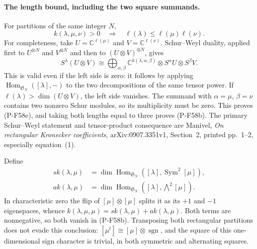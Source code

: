 \paragraph{The length bound, including the two square summands.}
For partitions of the same integer $N$,
\[
 k(\lambda,\mu,\nu)>0
          \quad\Longrightarrow\quad
 \ell(\lambda)\le\ell(\mu)\ell(\nu).                   \tag{P-F58e}
\]
For completeness, take $U=\mathbb C^{\ell(\mu)}$ and
$V=\mathbb C^{\ell(\nu)}$.  Schur--Weyl duality, applied
first to $U^{\otimes N}$ and $V^{\otimes N}$ and then to
$(U\otimes V)^{\otimes N}$, gives
\[
 S^\lambda(U\otimes V)
   \cong\bigoplus_{\alpha,\beta}
       \mathbb C^{k(\lambda,\alpha,\beta)}
                        \otimes S^\alpha U\otimes S^\beta V.
                                                        \tag{P-F58f}
\]
This is valid even if the left side is zero: it follows by
applying $\operatorname{Hom}_{\mathfrak S_N}([\lambda],-)$
to the two decompositions of the same tensor power.  If
$\ell(\lambda)>\dim(U\otimes V)$, the left side vanishes.
The summand with $\alpha=\mu$, $\beta=\nu$ contains two
nonzero Schur modules, so its multiplicity must be zero.
This proves (P-F58e), and taking both lengths equal to three
proves (P-F58b).  The primary Schur--Weyl statement and
tensor-product consequence are Manivel, \emph{On rectangular
Kronecker coefficients}, arXiv:0907.3351v1, Section~2,
printed pp.~1--2, especially equation~(1).

Define
\[
 \begin{split}
 sk(\lambda,\mu)&=\dim\operatorname{Hom}_{\mathfrak S_N}
                           ([\lambda],\operatorname{Sym}^2[\mu]),\\
 ak(\lambda,\mu)&=\dim\operatorname{Hom}_{\mathfrak S_N}
                           ([\lambda],\bigwedge^2[\mu]).
 \end{split}
\]
In characteristic zero the flip of $[\mu]\otimes[\mu]$
splits it as its $+1$ and $-1$ eigenspaces, whence
$k(\lambda,\mu,\mu)=sk(\lambda,\mu)+ak(\lambda,\mu)$.
Both terms are nonnegative, so both vanish in (P-F58b).
Transposing both rectangular partitions does not evade this
conclusion: $[\mu^t]\cong[\mu]\otimes\operatorname{sgn}$,
and the square of this one-dimensional sign character is
trivial, in both symmetric and alternating squares.

